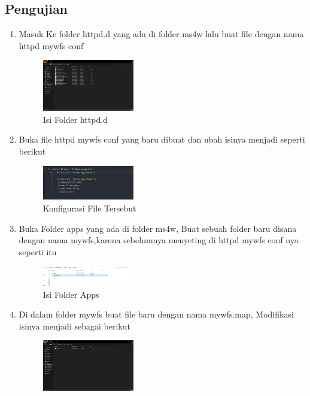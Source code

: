 \subsection{Pengujian}
\begin{enumerate}
  \item Masuk Ke folder httpd.d yang ada di folder ms4w lalu buat file dengan nama httpd mywfs conf
  \hfill\break
    \begin{figure}[H]
		\includegraphics[width=4cm]{figures/1174027/4/12.png}
		\centering
		\caption{Isi Folder httpd.d}
    \end{figure}
  \item Buka file httpd mywfs conf yang baru dibuat dan ubah isinya menjadi seperti berikut
  \hfill\break
    \begin{figure}[H]
		\includegraphics[width=4cm]{figures/1174051/4/8.png}
		\centering
		\caption{Konfigurasi File Tersebut}
    \end{figure}
  \item Buka Folder apps yang ada di folder ms4w, Buat sebuah folder baru disana dengan nama mywfs,karena sebelumnya menyeting di httpd mywfs conf nya seperti itu
  \hfill\break
    \begin{figure}[H]
		\includegraphics[width=4cm]{figures/1174051/4/9.png}
		\centering
		\caption{Isi Folder Apps}
    \end{figure}
  \item Di dalam folder mywfs buat file baru dengan nama mywfs.map, Modifikasi isinya menjadi sebagai berikut
  \hfill\break
    \begin{figure}[H]
		\includegraphics[width=4cm]{figures/1174027/4/17.png}

\end{figure}
\end{enumerate}
